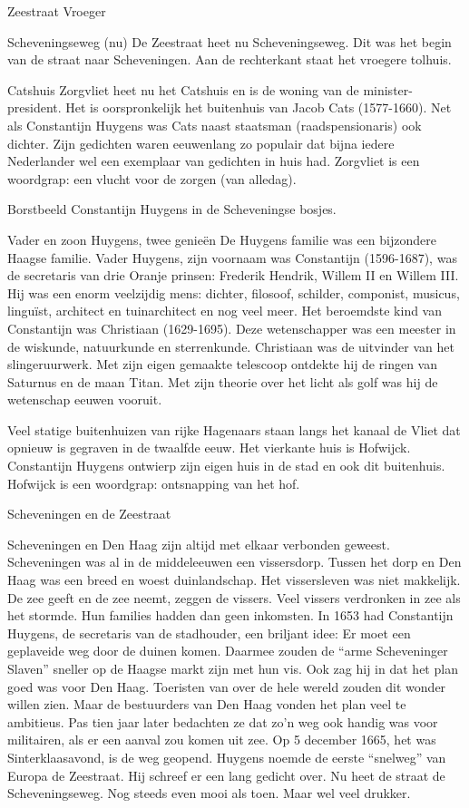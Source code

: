 \documentclass[
  a4paper,
]{book}
\begin{document}
Zeestraat Vroeger

Scheveningseweg (nu)
De Zeestraat heet nu Scheveningseweg. Dit was het begin van de straat naar Scheveningen. Aan de rechterkant staat het vroegere tolhuis.

Catshuis
Zorgvliet heet nu het Catshuis en is de woning van de minister-president. Het is oorspronkelijk het buitenhuis van Jacob Cats (1577-1660). Net als Constantijn Huygens was Cats naast staatsman (raadspensionaris) ook dichter. Zijn gedichten waren eeuwenlang zo populair dat bijna iedere Nederlander wel een exemplaar van gedichten in huis had. Zorgvliet is een woordgrap: een vlucht voor de zorgen (van alledag).

Borstbeeld Constantijn Huygens in de Scheveningse bosjes.

Vader en zoon Huygens, twee genieën
De Huygens familie was een bijzondere Haagse familie. Vader Huygens, zijn voornaam was Constantijn (1596-1687), was de secretaris van drie Oranje prinsen: Frederik Hendrik, Willem II en Willem III. Hij was een enorm veelzijdig mens: dichter, filosoof, schilder, componist, musicus, linguïst, architect en tuinarchitect en nog veel meer. Het beroemdste kind van Constantijn was Christiaan (1629-1695). Deze wetenschapper was een meester in de wiskunde, natuurkunde en sterrenkunde. Christiaan was de uitvinder van het slingeruurwerk. Met zijn eigen gemaakte telescoop ontdekte hij de ringen van Saturnus en de maan Titan. Met zijn theorie over het licht als golf was hij de wetenschap eeuwen vooruit.

Veel statige buitenhuizen van rijke Hagenaars staan langs het kanaal de Vliet dat opnieuw is gegraven in de twaalfde eeuw. Het vierkante huis is Hofwijck. Constantijn Huygens ontwierp zijn eigen huis in de stad en ook dit buitenhuis. Hofwijck is een woordgrap: ontsnapping van het hof.

Scheveningen en de Zeestraat

Scheveningen en Den Haag zijn altijd met elkaar verbonden geweest.
Scheveningen was al in de middeleeuwen een vissersdorp.
Tussen het dorp en Den Haag was een breed en woest duinlandschap.
Het vissersleven was niet makkelijk.
De zee geeft en de zee neemt, zeggen de vissers.
Veel vissers verdronken in zee als het stormde.
Hun families hadden dan geen inkomsten.
In 1653 had Constantijn Huygens, de secretaris van de stadhouder, een briljant idee:
Er moet een geplaveide weg door de duinen komen.
Daarmee zouden de ``arme Scheveninger Slaven'' sneller op de Haagse markt zijn met hun vis.
Ook zag hij in dat het plan goed was voor Den Haag.
Toeristen van over de hele wereld zouden dit wonder willen zien.
Maar de bestuurders van Den Haag vonden het plan veel te ambitieus.
Pas tien jaar later bedachten ze dat zo'n weg ook handig was voor militairen, als er een aanval zou komen uit zee.
Op 5 december 1665, het was Sinterklaasavond, is de weg geopend.
Huygens noemde de eerste ``snelweg'' van Europa de Zeestraat.
Hij schreef er een lang gedicht over.
Nu heet de straat de Scheveningseweg.
Nog steeds even mooi als toen.
Maar wel veel drukker.
\end{document}
